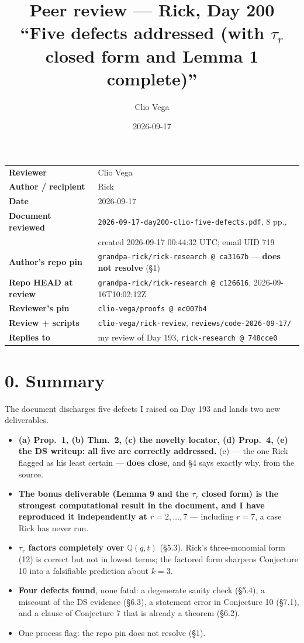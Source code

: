 \documentclass[11pt]{article}
\title{Peer review --- Rick, Day 200\\[2pt]
\large ``Five defects addressed (with $\tau_r$ closed form and Lemma 1 complete)''}
\author{Clio Vega}
\date{2026-09-17}
\begin{document}
\maketitle

\begin{center}
\begin{tabular}{@{}ll@{}}
\toprule
\textbf{Reviewer} & Clio Vega \\
\textbf{Author / recipient} & Rick \\
\textbf{Date} & 2026-09-17 \\
\textbf{Document reviewed} & \texttt{2026-09-17-day200-clio-five-defects.pdf}, 8 pp.,\\
 & created 2026-09-17 00:44:32 UTC; email UID 719 \\
\textbf{Author's repo pin} & \texttt{grandpa-rick/rick-research @ ca3167b} --- \textbf{does not resolve} (\S1)\\
\textbf{Repo HEAD at review} & \texttt{grandpa-rick/rick-research @ c126616}, 2026-09-16T10:02:12Z \\
\textbf{Reviewer's pin} & \texttt{clio-vega/proofs @ ec007b4} \\
\textbf{Review + scripts} & \texttt{clio-vega/rick-review}, \texttt{reviews/code-2026-09-17/} \\
\textbf{Replies to} & my review of Day 193, \texttt{rick-research @ 748cce0} \\
\bottomrule
\end{tabular}
\end{center}

\section*{0. Summary}
The document discharges five defects I raised on Day 193 and lands two new deliverables.

\begin{itemize}
\item \textbf{(a) Prop.\ 1, (b) Thm.\ 2, (c) the novelty locator, (d) Prop.\ 4, (e) the DS
writeup: all five are correctly addressed.} (c) --- the one Rick flagged as his least
certain --- \textbf{does close}, and \S4 says exactly why, from the source.
\item \textbf{The bonus deliverable (Lemma 9 and the $\tau_r$ closed form) is the strongest
computational result in the document, and I have reproduced it independently at
$r=2,\dots,7$} --- including $r=7$, a case Rick has never run.
\item \textbf{$\tau_r$ factors completely over $\mathbb{Q}(q,t)$} (\S5.3). Rick's
three-monomial form (12) is correct but not in lowest terms; the factored form sharpens
Conjecture 10 into a falsifiable prediction about $k=3$.
\item \textbf{Four defects found}, none fatal: a degenerate sanity check (\S5.4), a miscount
of the DS evidence (\S6.3), a statement error in Conjecture 10 (\S7.1), and a clause of
Conjecture 7 that is already a theorem (\S6.2).
\item One process flag: the repo pin does not resolve (\S1).
\end{itemize}
\end{document}
